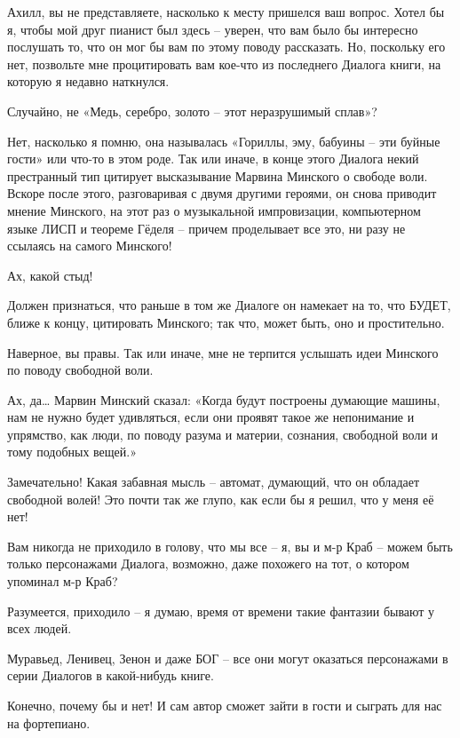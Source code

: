 \documentclass[../main.tex]{subfiles}
\begin{document}
\begin{dialogue}
 Ахилл, вы не представляете, насколько к месту пришелся ваш вопрос. Хотел бы я, чтобы мой друг пианист был здесь \--- уверен, что вам было бы интересно послушать то, что он мог бы вам по этому поводу рассказать. Но, поскольку его нет, позвольте мне процитировать вам кое-что из последнего Диалога книги, на которую я недавно наткнулся.

 Случайно, не «Медь, серебро, золото \--- этот неразрушимый сплав»?

 Нет, насколько я помню, она называлась «Гориллы, эму, бабуины \--- эти буйные гости» или что-то в этом роде. Так или иначе, в конце этого Диалога некий престранный тип цитирует высказывание Марвина Минского о свободе воли. Вскоре после этого, разговаривая с двумя другими героями, он снова приводит мнение Минского, на этот раз о музыкальной импровизации, компьютерном языке ЛИСП и теореме Гёделя \--- причем проделывает все это, ни разу не ссылаясь на самого Минского!

 Ах, какой стыд!

 Должен признаться, что раньше в том же Диалоге он намекает на то, что БУДЕТ, ближе к концу, цитировать Минского; так что, может быть, оно и простительно.

 Наверное, вы правы. Так или иначе, мне не терпится услышать идеи Минского по поводу свободной воли.

 Ах, да\ldots{} Марвин Минский сказал: «Когда будут построены думающие машины, нам не нужно будет удивляться, если они проявят такое же непонимание и упрямство, как люди, по поводу разума и материи, сознания, свободной воли и тому подобных вещей.»

 Замечательно! Какая забавная мысль \--- автомат, думающий, что он обладает свободной волей! Это почти так же глупо, как если бы я решил, что у меня её нет!

 Вам никогда не приходило в голову, что мы все \--- я, вы и м-р Краб \--- можем быть только персонажами Диалога, возможно, даже похожего на тот, о котором упоминал м-р Краб?

 Разумеется, приходило \--- я думаю, время от времени такие фантазии бывают у всех людей.

 Муравьед, Ленивец, Зенон и даже БОГ \--- все они могут оказаться персонажами в серии Диалогов в какой-нибудь книге.

 Конечно, почему бы и нет! И сам автор сможет зайти в гости и сыграть для нас на фортепиано.


\end{dialogue}
\end{document}
